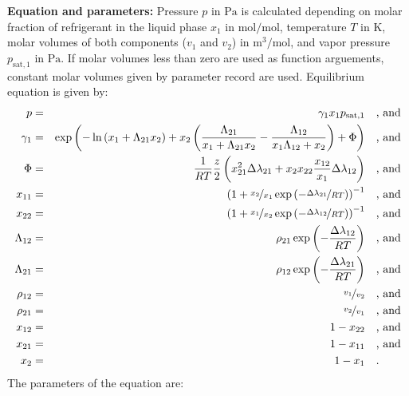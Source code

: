 \textbf{Equation and parameters:}
\newline
%
Pressure $p$ in $\si{\pascal}$ is calculated depending on molar fraction of refrigerant in the liquid phase $x_1$ in $\si{\mole\per\mole}$, temperature $T$ in $\si{\kelvin}$, molar volumes of both components ($v_1$ and $v_2$) in $\si{\cubic\meter\per\mole}$, and vapor pressure $p_\mathrm{sat,1}$ in $\si{\pascal}$. If molar volumes less than zero are used as function arguements, constant molar volumes given by parameter record are used. Equilibrium equation is given by:
%
\begin{equation*}
\begin{split}
p &=& \gamma_1 x_1 p_\mathrm{sat,1} & \quad\text{, and} \\
\gamma_1 &=& \exp \left( - \ln \left( x_1 + \Lambda_{21} x_2 \right) + x_2 \left( \frac{\Lambda_{21}}{x_1 + \Lambda_{21} x_2} - \frac{\Lambda_{12}}{x_1 \Lambda_{12} + x_2} \right) + \Phi \right) & \quad\text{, and} \\
\Phi &=& \frac{1}{R T} \frac{z}{2} \left( x_{21}^2 \Delta\lambda_{21} + x_2 x_{22} \frac{x_{12}}{x_1} \Delta\lambda_{12} \right) & \quad\text{, and} \\
x_{11} &=& \left( 1 + \nicefrac{x_2}{x_1} \exp \left( - \nicefrac{\Delta\lambda_{21}}{R T} \right) \right) ^ {-1} & \quad\text{, and} \\
x_{22} &=& \left( 1 + \nicefrac{x_1}{x_2} \exp \left( - \nicefrac{\Delta\lambda_{12}}{R T} \right) \right) ^ {-1} & \quad\text{, and} \\
\Lambda_{12} &=& \rho_{21} \exp \left( - \frac{\Delta\lambda_{12}}{R T} \right) & \quad\text{, and} \\
\Lambda_{21} &=& \rho_{12} \exp \left( - \frac{\Delta\lambda_{21}}{R T} \right) & \quad\text{, and} \\
\rho_{12} &=& \nicefrac{v_1}{v_2} & \quad\text{, and} \\
\rho_{21} &=& \nicefrac{v_2}{v_1} & \quad\text{, and} \\
x_{12} &=& 1 - x_{22} & \quad\text{, and} \\
x_{21} &=& 1 - x_{11} & \quad\text{, and} \\
x_2 &=& 1 - x_1  & \quad\text{.} \\
\end{split}
\end{equation*}
%
The parameters of the equation are:
%
